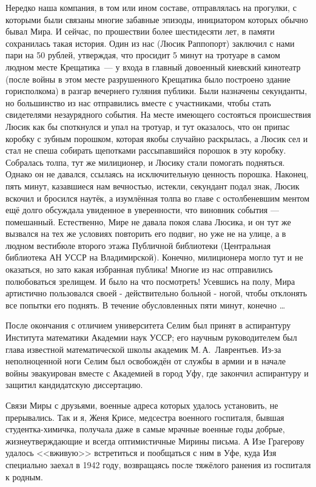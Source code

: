 Нередко наша компания, в том или ином составе, отправлялась на прогулки, с которыми были связаны многие забавные эпизоды, инициатором которых обычно бывал Мира. И сейчас, по прошествии более шестидесяти лет, в памяти сохранилась такая история. Один из нас (Люсик Раппопорт) заключил с нами пари на 50 рублей, утверждая, что просидит 5 минут на тротуаре в самом людном месте Крещатика~--- у входа в главный довоенный киевский кинотеатр (после войны в этом месте разрушенного Крещатика было построено здание горисполкома) в разгар вечернего гуляния публики. Были назначены секунданты, но большинство из нас отправились вместе с участниками, чтобы стать свидетелями незаурядного события. На месте имеющего состояться происшествия Люсик как бы споткнулся и упал на тротуар, и тут оказалось, что он припас коробку с зубным порошком, которая якобы случайно раскрылась, а Люсик сел и стал не спеша собирать щепотками рассыпавшийся порошок в эту коробку. Собралась толпа, тут же милиционер, и Люсику стали помогать подняться. Однако он не давался, ссылаясь на исключительную ценность порошка. Наконец, пять минут, казавшиеся нам вечностью, истекли, секундант подал знак, Люсик вскочил и бросился наутёк, а изумлённая толпа во главе с остолбеневшим ментом ещё долго обсуждала увиденное в уверенности, что виновник события --- помешанный. Естественно, Мире не давала покоя слава Люсика, и он тут же вызвался на тех же условиях повторить его подвиг, но уже не на улице, а в людном вестибюле второго этажа Публичной библиотеки (Центральная библиотека АН УССР на Владимирской). Конечно, милиционера могло тут и не оказаться, но зато какая избранная публика! Многие из нас отправились полюбоваться зрелищем. И было на что посмотреть! Усевшись на полу, Мира артистично пользовался своей - действительно больной - ногой, чтобы отклонять все попытки его поднять. В течение обусловленных пяти минут, конечно \ldots

После окончания с отличием университета Селим был принят в аспирантуру Института математики Академии наук УССР; его научным руководителем был глава известной математической школы академик М.\,А.~Лаврентьев. Из-за неполноценной ноги Селим был освобождён от службы в армии и в начале войны эвакуирован вместе с Академией в город Уфу, где закончил аспирантуру и защитил
кандидатскую диссертацию.

Связи Миры с друзьями, военные адреса которых удалось установить, не прерывались. Так и я, Женя Крисе, медсестра военного госпиталя, бывшая студентка-химичка, получала даже в самые мрачные военные годы добрые, жизнеутверждающие и всегда оптимистичные Мирины письма. А Изе Грагерову удалось <<вживую>> встретиться и пообщаться с ним в Уфе, куда Изя специально заехал в 1942 году, возвращаясь после тяжёлого ранения из госпиталя к родным.

